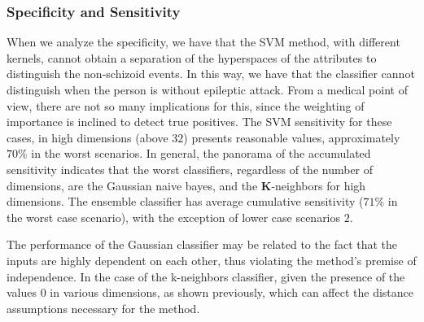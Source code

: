 \subsubsection{Specificity and Sensitivity}

When we analyze the specificity, we have that the SVM method, with different kernels, cannot obtain a separation of the hyperspaces of the attributes to distinguish the non-schizoid events. In this way, we have that the classifier cannot distinguish when the person is without epileptic attack. From a medical point of view, there are not so many implications for this, since the weighting of importance is inclined to detect true positives. The SVM sensitivity for these cases, in high dimensions (above $ 32 $) presents reasonable values, approximately $70\%$ in the worst scenarios. In general, the panorama of the accumulated sensitivity indicates that the worst classifiers, regardless of the number of dimensions, are the Gaussian naive bayes, and the \textbf{K}-neighbors for high dimensions. The ensemble classifier has average cumulative sensitivity ($ 71 \% $ in the worst case scenario), with the exception of lower case scenarios $ 2 $.

The performance of the Gaussian classifier may be related to the fact that the inputs are highly dependent on each other, thus violating the method's premise of independence. In the case of the k-neighbors classifier, given the presence of the values $ 0 $ in various dimensions, as shown previously, which can affect the distance assumptions necessary for the method.


